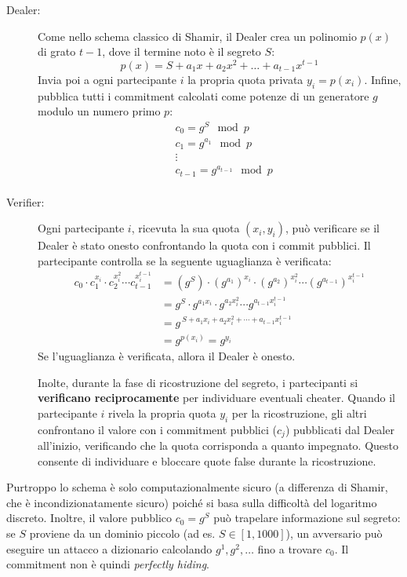 \documentclass[a4paper, 11pt]{article}
\begin{document}
\begin{description}
    \item[Dealer:] Come nello schema classico di Shamir, il Dealer crea un polinomio $p(x)$ di grato $t-1$, dove il termine noto è il segreto $S$:
    \[
        p(x) = S + a_1x + a_2x^2 + \dots + a_{t-1}x^{t-1}
    \]
    Invia poi a ogni partecipante $i$ la propria quota privata $y_i = p(x_i)$. Infine, pubblica tutti i commitment calcolati come potenze di un generatore $g$ modulo un numero primo $p$:
    \begin{align*}
        &c_0 = g^S \mod p \\
        &c_1 = g^{a_1} \mod p \\
        &\vdots \\
        &c_{t-1} = g^{a_{t-1}} \mod p \\
    \end{align*}
    \item[Verifier:] Ogni partecipante $i$, ricevuta la sua quota $(x_i, y_i)$, può verificare se il Dealer è stato onesto confrontando la quota con i commit pubblici. Il partecipante controlla se la seguente uguaglianza è verificata:
    \begin{align*}
        c_0 \cdot c_1^{x_i} \cdot c_2^{x_i^2} \cdots c_{t-1}^{x_i^{t-1}} &= (g^S) \cdot (g^{a_1})^{x_i} \cdot (g^{a_2})^{x_i^2} \cdots (g^{a_{t-1}})^{x_i^{t-1}} \\
        &= g^S \cdot g^{a_1 x_i} \cdot g^{a_2 x_i^2} \cdots g^{a_{t-1} x_i^{t-1}} \\
        &= g^{\,S + a_1 x_i + a_2 x_i^2 + \cdots + a_{t-1} x_i^{t-1}} \\
        &= g^{p(x_i)} = g^{y_i}
    \end{align*}
    Se l'uguaglianza è verificata, allora il Dealer è onesto.
    
    Inolte, durante la fase di ricostruzione del segreto, i partecipanti si \textbf{verificano reciprocamente} per individuare eventuali cheater. Quando il partecipante $i$ rivela la propria quota $y_i$ per la ricostruzione, gli altri confrontano il valore con i commitment pubblici ($c_j$) pubblicati dal Dealer all'inizio, verificando che la quota corrisponda a quanto impegnato. Questo consente di individuare e bloccare quote false durante la ricostruzione.
    \end{description}

    Purtroppo lo schema è solo computazionalmente sicuro (a differenza di Shamir, che è incondizionatamente sicuro) poiché si basa sulla difficoltà del logaritmo discreto. Inoltre, il valore pubblico $c_0 = g^{S}$ può trapelare informazione sul segreto: se $S$ proviene da un dominio piccolo (ad es. $S \in [1,1000]$), un avversario può eseguire un attacco a dizionario calcolando $g^1, g^2, \dots$ fino a trovare $c_0$. Il commitment non è quindi \textit{perfectly hiding}.
\end{document}
